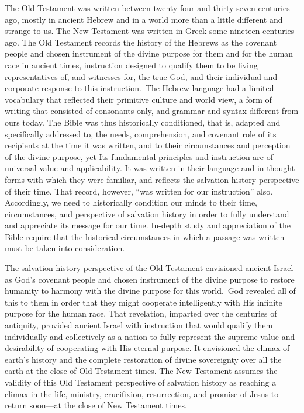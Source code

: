 The Old Testament was written between twenty-four and thirty-seven centuries
ago, mostly in ancient Hebrew and in a world more than a little different
and strange to us. The New Testament was written in Greek some nineteen
centuries ago. The Old Testament records the history of the Hebrews as the 
covenant people and chosen instrument of the divine purpose for them and for
the human race in ancient times, instruction designed to qualify them to be
living representatives of, and witnesses for, the true God, and their
individual and corporate response to this instruction.\noteXXXV~The Hebrew language
had a limited vocabulary that reflected their primitive culture and world
view, a form of writing that consisted of consonants only, and grammar and
syntax different from ours today.
\newpage
The Bible was thus historically conditioned,\cite{55} that is, adapted and
specifically addressed to, the needs, comprehension, and covenant role of
its recipients at the time it was written, and to their circumstances and
perception of the divine purpose, yet Its fundamental principles and
instruction are of universal value and applicability. It was written in
their language and in thought forms with which they were familiar, and
reflects the salvation history perspective of their time. That record,
however, ``was written for our instruction'' also. Accordingly, we need to
historically condition our minds to their time, circumstances, and
perspective of salvation history in order to fully understand and appreciate
its message for our time. In-depth study and appreciation of the Bible
require that the historical circumstances in which a passage was written
must be taken into consideration.

The salvation history perspective of the Old Testament envisioned ancient
Israel as God's covenant people and chosen instrument of the divine purpose
to restore humanity to harmony with the divine purpose for this 
world.\noteXXXV~God
revealed all of this to them in order that they might cooperate
intelligently with His infinite purpose for the human race. That revelation,
imparted over the centuries of antiquity, provided ancient Israel with
instruction that would qualify them individually and collectively as a
nation to fully represent the supreme value and desirability of cooperating
with His eternal purpose. It envisioned the climax of earth's history and
the complete restoration of divine sovereignty over all the earth at the
close of Old Testament times. The New Testament assumes the validity of this
Old Testament perspective of salvation history as reaching a climax in the
life, ministry, crucifixion, resurrection, and promise of Jesus to return
soon---at the close of New Testament times.

